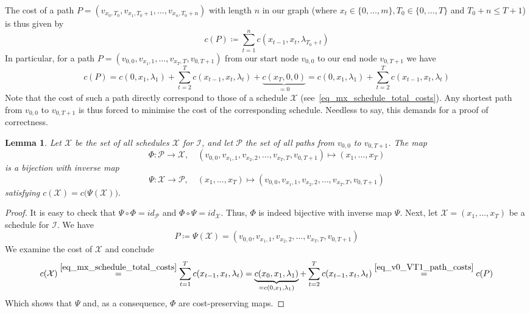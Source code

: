 \documentclass[hidelinks]{article}
\theoremstyle{plain}
\newtheorem{lem}[thm]{Lemma}
\theoremstyle{definition}
\theoremstyle{rem}
\newcommand{\mx}{\mathcal{X}}
\newcommand{\inp}{\mathcal{I}}
\newcommand{\costs}{c}
\newcommand{\fromto}[2]{\{#1,\ldots,#2\}}
\begin{document}
The cost of a path $P=(v_{x_0,T_0},v_{x_1,T_0+1},\ldots,v_{x_n,T_0+n})$ with length $n$ in our graph (where $x_t\in\fromto{0}{m}, T_0\in\fromto{0}{T}$ and $T_0+n\leq T+1$) is thus given by
\begin{equation*}
	\costs(P)\coloneqq\sum\limits_{t=1}^{n}\costs(x_{t-1},x_t,\lambda_{T_0+t})
\end{equation*}
In particular, for a path $P=(v_{0,0},v_{x_1,1},\ldots,v_{x_T,T},v_{0,T+1})$ from our start node $v_{0,0}$ to our end node $v_{0,T+1}$ we have
\begin{equation}
	\costs(P)=\costs(0,x_1,\lambda_1)+\sum\limits_{t=2}^{T}\costs(x_{t-1},x_{t},\lambda_{t})+\underbrace{\costs(x_T,0,0)}_{=0}=\costs(0,x_1,\lambda_1)+\sum\limits_{t=2}^{T}\costs(x_{t-1},x_{t},\lambda_{t})\label{eq_v0_VT1_path_costs}
\end{equation}
Note that the cost of such a path directly correspond to those of a schedule $\mx$ (see~\eqref{eq_mx_schedule_total_costs}).
Any shortest path from $v_{0,0}$ to $v_{0,T+1}$ is thus forced to minimise the cost of the corresponding schedule. Needless to say, this demands for a proof of correctness.
\begin{lem}\label{lem_sched_path_pseudo_poly}
Let $\bm{\mx}$ be the set of all schedules $\mx$ for $\inp$, and let $\bm{\mathcal{P}}$ the set of all paths from $v_{0,0}$ to $v_{0,T+1}$. The map
\begin{equation*}
	\Phi:\bm{\mathcal{P}}\rightarrow\bm{\mx},\quad (v_{0,0},v_{x_1,1},v_{x_2,2},\ldots,v_{x_T,T},v_{0,T+1})\mapsto (x_1,\ldots,x_T)
\end{equation*}
is a bijection with inverse map
\begin{equation*}
	\Psi:\bm{\mx}\rightarrow\bm{\mathcal{P}},\quad(x_1,\ldots,x_T)\mapsto (v_{0,0},v_{x_1,1},v_{x_2,2},\ldots,v_{x_T,T},v_{0,T+1})
\end{equation*}
satisfying $\costs(\mx)=\costs\bigl(\Psi(\mx)\bigr)$.
\end{lem}
\begin{proof}
It is easy to check that $\Psi\circ\Phi=id_{\bm{\mathcal{P}}}$ and $\Phi\circ\Psi=id_{\bm{\mx}}$. Thus, $\Phi$ is indeed bijective with inverse map $\Psi$. Next, let $\mx=(x_1,\ldots,x_T)$ be a schedule for $\inp$. We have
\begin{equation*}
	P\coloneqq\Psi(\mx)=(v_{0,0},v_{x_1,1},v_{x_2,2},\ldots,v_{x_T,T},v_{0,T+1})
\end{equation*}
We examine the cost of $\mx$ and conclude
\begin{equation*}
\costs(\mx)\stackrel{\eqref{eq_mx_schedule_total_costs}}{=}\sum\limits_{t=1}^{T}\costs(x_{t-1},x_{t},\lambda_t)=\underbrace{\costs(x_0,x_1,\lambda_1)}_{=\costs(0,x_1,\lambda_1)}+\sum\limits_{t=2}^{T}\costs(x_{t-1},x_{t},\lambda_t)\stackrel{\eqref{eq_v0_VT1_path_costs}}{=}\costs(P)
\end{equation*}
Which shows that $\Psi$ and, as a consequence, $\Phi$ are cost-preserving maps.
\end{proof}
\end{document}
